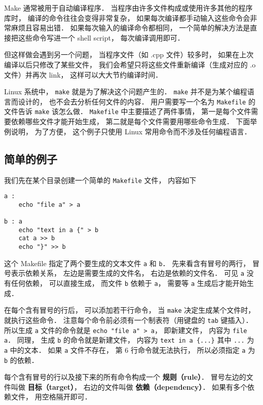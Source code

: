 
Make 通常被用于自动编译程序． 当程序由许多文件构成或使用许多其他的程序库时， 编译的命令往往会变得非常复杂， 如果每次编译都手动输入这些命令会非常麻烦且容易出错． 如果每次输入的编译命令都相同， 一个简单的解决方法是直接把这些命令写进一个 shell script， 每次编译调用即可．

但这样做会遇到另一个问题， 当程序文件（如 .cpp 文件）较多时， 如果在上次编译以后只修改了某些文件， 我们会希望只将这些文件重新编译（生成对应的 .o 文件）并再次 link， 这样可以大大节约编译时间．

Linux 系统中， \lstinline|make| 就是为了解决这个问题产生的． \lstinline|make| 并不是为某个编程语言而设计的， 也不会去分析任何文件的内容． 用户需要写一个名为 \lstinline|Makefile| 的文件告诉 \lstinline|make| 该怎么做． \lstinline|Makefile| 中主要描述了两件事情， 第一是每个文件需要依赖哪些文件才能开始生成， 第二就是每个文件需要用哪些命令生成． 下面举例说明， 为了方便， 这个例子只使用 Linux 常用命令而不涉及任何编程语言．


\subsection{简单的例子}
我们先在某个目录创建一个简单的 \lstinline|Makefile| 文件， 内容如下
\begin{lstlisting}
a :
	echo "file a" > a

b : a
	echo "text in a {" > b
	cat a >> b
	echo "}" >> b
\end{lstlisting}
这个 Makefile 指定了两个要生成的文本文件 \lstinline|a| 和 \lstinline|b|． 先来看含有冒号的两行， 冒号表示依赖关系， 左边是需要生成的文件名， 右边是依赖的文件名． 可见 \lstinline|a| 没有任何依赖， 可以直接生成， 而文件 \lstinline|b| 依赖于 \lstinline|a|， 需要等 \lstinline|a| 生成后才能开始生成．

在每个含有冒号的行后， 可以添加若干行命令， 当 \lstinline|make| 决定生成某个文件时， 就执行这些命令． 注意每个命令前必须有一个制表符（用键盘的 \lstinline|tab| 键插入）． 所以生成 \lstinline|a| 文件的命令就是 \lstinline|echo "file a" > a|， 即新建文件， 内容为 \lstinline|file a|． 同理， 生成 \lstinline|b| 的命令就是新建文件， 内容为 \lstinline|text in a {...}| 其中 \lstinline|...| 为 \lstinline|a| 中的文本． 如果 \lstinline|a| 文件不存在， 第 6 行命令就无法执行， 所以必须指定 \lstinline|a| 为 \lstinline|b| 的依赖．

每个含有冒号的行以及接下来的所有命令构成一个 \textbf{规则（rule）}． 冒号左边的文件叫做 \textbf{目标（target）}， 右边的文件叫做 \textbf{依赖（dependency）}． 如果有多个依赖文件， 用空格隔开即可．

